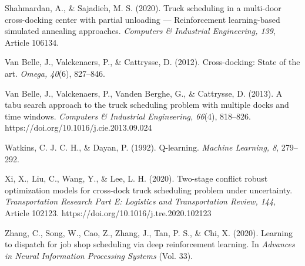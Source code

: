 \documentclass[
]{article}
\begin{document}
Shahmardan, A., \& Sajadieh, M. S. (2020). Truck scheduling in a
multi-door cross-docking center with partial unloading --- Reinforcement
learning-based simulated annealing approaches. \emph{Computers \&
Industrial Engineering, 139}, Article 106134.

Van Belle, J., Valckenaers, P., \& Cattrysse, D. (2012). Cross-docking:
State of the art. \emph{Omega, 40}(6), 827--846.

Van Belle, J., Valckenaers, P., Vanden Berghe, G., \& Cattrysse, D.
(2013). A tabu search approach to the truck scheduling problem with
multiple docks and time windows. \emph{Computers \& Industrial
Engineering, 66}(4), 818--826. https://doi.org/10.1016/j.cie.2013.09.024

Watkins, C. J. C. H., \& Dayan, P. (1992). Q-learning. \emph{Machine
Learning, 8}, 279--292.

Xi, X., Liu, C., Wang, Y., \& Lee, L. H. (2020). Two-stage conflict
robust optimization models for cross-dock truck scheduling problem under
uncertainty. \emph{Transportation Research Part E: Logistics and
Transportation Review, 144}, Article 102123.
https://doi.org/10.1016/j.tre.2020.102123

Zhang, C., Song, W., Cao, Z., Zhang, J., Tan, P. S., \& Chi, X. (2020).
Learning to dispatch for job shop scheduling via deep reinforcement
learning. In \emph{Advances in Neural Information Processing Systems}
(Vol. 33).
\end{document}
